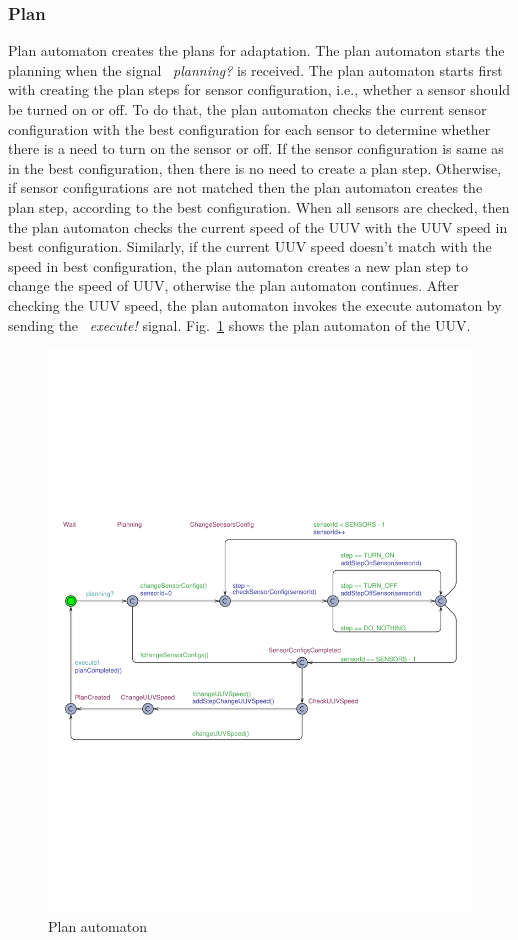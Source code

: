 \subsubsection{Plan}
Plan automaton creates the plans for adaptation. The plan automaton starts the planning when the signal ~\textit{planning?} is received. The plan automaton starts first with creating the plan steps for sensor configuration, i.e., whether a sensor should be turned on or off. To do that, the plan automaton checks the current sensor configuration with the best configuration for each sensor to determine whether there is a need to turn on the sensor or off. If the sensor configuration is same as in the best configuration, then there is no need to create a plan step. Otherwise, if sensor configurations are not matched then the plan automaton creates the plan step, according to the best configuration. When all sensors are checked, then the plan automaton checks the current speed of the UUV with the UUV speed in best configuration. Similarly, if the current UUV speed doesn't match with the speed in best configuration, the plan automaton creates a new plan step to change the speed of UUV, otherwise the plan automaton continues. After checking the UUV speed, the plan automaton invokes the execute automaton by sending the ~\textit{execute!} signal. Fig.~\ref{fig:plan-automaton} shows the plan automaton of the UUV.
\begin{figure}[t]
	\centering
	\includegraphics[width=1\textwidth]{figures/Planner}
	\caption{Plan automaton}\label{fig:plan-automaton}
	
	\vspace*{-2mm}
\end{figure}


